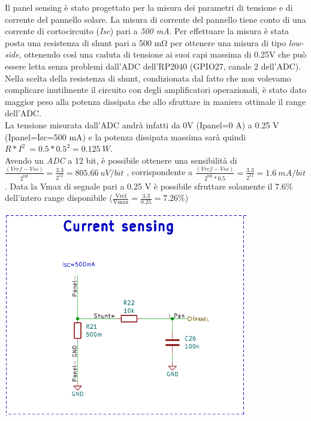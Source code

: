 Il panel sensing è stato progettato per la misura dei parametri di
tensione e di corrente del pannello solare. La misura di corrente del
pannello tiene conto di una corrente di cortocircuito (\emph{Isc}) pari
a \emph{500 mA}. Per effettuare la misura è stata posta una resistenza
di shunt pari a 500 mΩ per ottenere una misura di tipo \emph{low-side},
ottenendo così una caduta di tensione ai suoi capi massima di 0.25V che
può essere letta senza problemi dall'ADC dell'RP2040 (GPIO27, canale 2
dell'ADC).\\
Nella scelta della resistenza di shunt, condizionata dal fatto che non
volevamo complicare inutilmente il circuito con degli amplificatori
operazionali, è stato dato maggior peso alla potenza dissipata che allo
sfruttare in maniera ottimale il range dell'ADC.\\
La tensione misurata dall'ADC andrà infatti da 0V (Ipanel=0 A) a 0.25 V
(Ipanel=Isc=500 mA) e la potenza dissipata massima sarà quindi
\(R*I^{2}\  = 0.5*0.5^{2} = 0.125\ W\).\\
Avendo un \emph{ADC} a 12 bit, è possibile ottenere una sensibilità di
\(\frac{(Vref - Vss)}{2^{\text{bit}}} = \frac{3.3}{2^{12}} = 805.66\ uV/bit\)
, corrispondente a
\(\frac{(Vref - Vss)}{2^{\text{bit}}*0.5} = \frac{3.3}{2^{11}} = 1.6\ mA/bit\).
Data la Vmax di segnale pari a 0.25 V è possibile sfruttare solamente il
7.6\% dell'intero range disponibile
(\(\frac{\text{Vref}}{\text{Vmax}} = \frac{3.3}{0.25} = 7.26\%\))

\begin{center}
\includegraphics[width=4.19954in,height=3.53646in]{figures/image19.png}
\captionsetup{type=figure}
\end{center}

